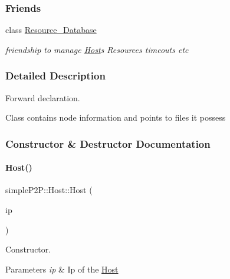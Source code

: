\subsubsection*{Friends}
\begin{DoxyCompactItemize}
\item 
\mbox{\label{classsimpleP2P_1_1Host_a8d5b8c31f7b51293954816c91b76cabd}} 
class \hyperlink{classsimpleP2P_1_1Host_a8d5b8c31f7b51293954816c91b76cabd}{Resource\+\_\+\+Database}
\begin{DoxyCompactList}\small\item\em friendship to manage \hyperlink{classsimpleP2P_1_1Host}{Host}\textquotesingle{}s Resources timeouts etc \end{DoxyCompactList}\end{DoxyCompactItemize}


\subsubsection{Detailed Description}
Forward declaration. 

Class contains node information and points to files it possess 

\subsubsection{Constructor \& Destructor Documentation}
\mbox{\label{classsimpleP2P_1_1Host_abbe0b5c51195b8cf2019d791ace5a5c7}} 
\paragraph{\texorpdfstring{Host()}{Host()}}
{\footnotesize\ttfamily simple\+P2\+P\+::\+Host\+::\+Host (\begin{DoxyParamCaption}\item[{boost\+::asio\+::ip\+::address}]{ip }\end{DoxyParamCaption})}



Constructor. 


\begin{DoxyParams}{Parameters}
{\em ip} & Ip of the \hyperlink{classsimpleP2P_1_1Host}{Host} \\
\hline
\end{DoxyParams}


